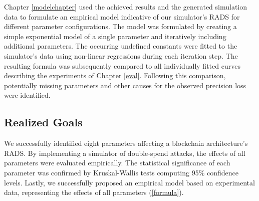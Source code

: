 \documentclass[a4paper,12pt,twoside]{report}
\begin{document}
Chapter \ref{modelchapter} used the achieved results and the generated simulation data to formulate an empirical model indicative of our simulator's RADS for different parameter configurations. The model was formulated by creating a simple exponential model of a single parameter and iteratively including additional parameters. The occurring undefined constants were fitted to the simulator's data using non-linear regressions during each iteration step. The resulting formula was subsequently compared to all individually fitted curves describing the experiments of Chapter \ref{eval}. Following this comparison, potentially missing parameters and other causes for the observed precision loss were identified. 
\subsection{Realized Goals}
We successfully identified eight parameters affecting a blockchain architecture's RADS. By implementing a simulator of double-spend attacks, the effects of all parameters were evaluated empirically. The statistical significance of each parameter was confirmed by Kruskal-Wallis tests computing 95\% confidence levels. Lastly, we successfully proposed an empirical model based on experimental data, representing the effects of all parameters (\autoref{formula}). 
\end{document}

